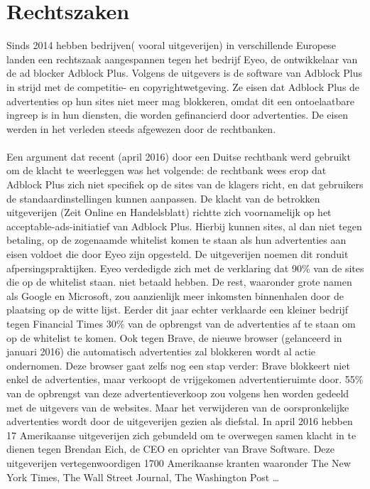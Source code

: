 \documentclass[pdftex,a4paper,12pt,twoside]{report}
\begin{document}
\section{Rechtszaken}
\label{sec Rechtszaken}
Sinds 2014 hebben bedrijven( vooral uitgeverijen) in verschillende Europese landen een rechtszaak aangespannen tegen het bedrijf Eyeo, de ontwikkelaar van de ad blocker Adblock Plus. Volgens de uitgevers is de software van Adblock Plus in strijd met de competitie- en copyrightwetgeving. Ze eisen dat Adblock Plus de advertenties op hun sites niet meer mag blokkeren, omdat dit een ontoelaatbare ingreep is in hun diensten, die worden gefinancierd door advertenties. 
De eisen werden in het verleden steeds afgewezen door de rechtbanken. 
\\
\\
Een argument dat recent (april 2016) door een Duitse rechtbank werd gebruikt om de klacht te weerleggen was het volgende: de rechtbank wees erop dat Adblock Plus zich niet specifiek op de sites van de klagers richt, en dat gebruikers de standaardinstellingen kunnen aanpassen. De klacht van de betrokken uitgeverijen (Zeit Online en Handelsblatt) richtte zich voornamelijk op het acceptable-ads-initiatief van Adblock Plus. Hierbij kunnen sites, al dan niet tegen betaling, op de zogenaamde whitelist komen te staan als hun advertenties aan eisen voldoet die door Eyeo zijn opgesteld. De uitgeverijen noemen dit ronduit afpersingspraktijken.
Eyeo verdedigde zich met de verklaring dat 90\% van de sites die op de whitelist staan. niet betaald hebben. De rest, waaronder grote namen als Google en Microsoft, zou aanzienlijk meer inkomsten binnenhalen door de plaatsing op de witte lijst. 
Eerder dit jaar echter verklaarde een kleiner bedrijf tegen Financial Times 30\% van de opbrengst van de advertenties af te staan om op de whitelist te komen.
Ook tegen Brave, de nieuwe browser (gelanceerd in januari 2016) die automatisch advertenties zal blokkeren wordt al actie ondernomen. Deze browser gaat zelfs nog een stap verder: Brave blokkeert niet enkel de advertenties, maar verkoopt de vrijgekomen advertentieruimte door. 55\% van de opbrengst van deze advertentieverkoop zou volgens hen worden gedeeld met de uitgevers van de websites. Maar het verwijderen van de oorspronkelijke advertenties wordt door de uitgeverijen gezien als diefstal.
In april 2016 hebben 17 Amerikaanse uitgeverijen zich gebundeld om te overwegen samen klacht in te dienen tegen Brendan Eich, de CEO en oprichter van Brave Software. Deze uitgeverijen vertegenwoordigen 1700 Amerikaanse kranten waaronder The New York Times, The Wall Street Journal, The Washington Post …
\end{document}
